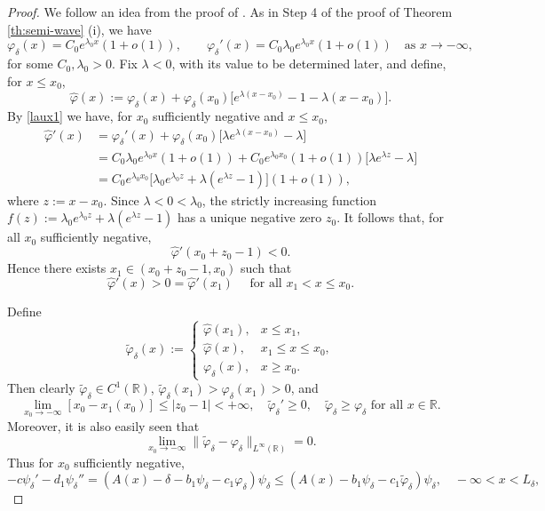 \documentclass[reqno]{amsart}
\theoremstyle{plain}
\theoremstyle{definition}
\theoremstyle{remark}
\begin{document}
	\begin{proof}
		We follow an idea from the proof of \cite[Lemma 3.3]{MR3609207}.
		As in Step 4 of the proof of Theorem \ref{th:semi-wave} (i), we have
		\begin{equation}\label{laux1}
			\varphi_{\delta}(x) = C_0 e^{\lambda_0 x}(1+o(1)),\qquad
			\varphi_{\delta}'(x) = C_0\lambda_0 e^{\lambda_0 x}(1+o(1))\quad\text{as }x\to-\infty,
		\end{equation}
		for some $C_0,\lambda_0>0$.		
		Fix $\lambda<0$, with its value to be determined later, and define, for $x\le x_0$,
		\[
		\hat{\varphi}(x) := \varphi_{\delta}(x) + \varphi_{\delta}(x_0)\bigl[e^{\lambda(x-x_0)} - 1 - \lambda(x-x_0)\bigr].
		\]
		By \eqref{laux1} we have, for $x_0$ sufficiently negative and $x\le x_0$,
		\[
		\begin{aligned}
			\hat{\varphi}'(x) &= \varphi_{\delta}'(x) + \varphi_{\delta}(x_0)\bigl[\lambda e^{\lambda(x-x_0)} - \lambda\bigr] \\
			&= C_0\lambda_0 e^{\lambda_0 x}(1+o(1)) + C_0 e^{\lambda_0 x_0}(1+o(1))\bigl[\lambda e^{\lambda z} - \lambda\bigr] \\
			&= C_0 e^{\lambda_0 x_0}\bigl[\lambda_0 e^{\lambda_0 z} + \lambda(e^{\lambda z}-1)\bigr](1+o(1)),
		\end{aligned}
		\]
		where $z:=x-x_0$. Since $\lambda<0<\lambda_0$, the strictly increasing function
		$f(z):=\lambda_0 e^{\lambda_0 z} + \lambda(e^{\lambda z}-1)$ has a unique negative zero $z_0$.
		It follows that, for all $x_0$ sufficiently negative,
		\[
		\hat{\varphi}'(x_0+z_0-1) < 0.
		\]
		Hence there exists $x_1\in(x_0+z_0-1,x_0)$ such that
		\[
		\hat{\varphi}'(x)>0=\hat{\varphi}'(x_1) \quad \text{ for all } x_1 < x \le x_0.
		\]
		
		Define
		\[
		\tilde{\varphi}_{\delta}(x) := 
		\begin{cases}
			\hat{\varphi}(x_1), & x\le x_1,\\
			\hat{\varphi}(x), & x_1\le x\le x_0,\\
			\varphi_{\delta}(x), & x\ge x_0.
		\end{cases}
		\]
		Then clearly $\tilde{\varphi}_{\delta}\in C^1(\mathbb{R})$, $\tilde{\varphi}_{\delta}(x_1)>\varphi_{\delta}(x_1)>0$, and
		\[
		\lim_{x_0\to-\infty}[x_0-x_1(x_0)]\le |z_0-1| < +\infty,\quad
		\tilde{\varphi}_{\delta}'\ge 0,\quad \tilde{\varphi}_{\delta}\ge\varphi_{\delta} \text{ for all } x\in\mathbb{R}.
		\]
		Moreover, it is also easily seen that
		\[
		\lim_{x_0\to-\infty}\|\tilde{\varphi}_\delta - \varphi_{\delta}\|_{L^\infty(\mathbb{R})}=0.
		\]
		Thus for $x_0$ sufficiently negative,
		\[
		-c \psi_{\delta}' - d_1 \psi_{\delta}'' = (A(x) - \delta - b_1\psi_{\delta} - c_1\varphi_{\delta})\psi_{\delta} \le (A(x) - b_1 \psi_\delta - c_1 \tilde{\varphi}_\delta) \psi_\delta, \quad-\infty < x < L_\delta,
		\]
		

\end{proof}
\end{document}
